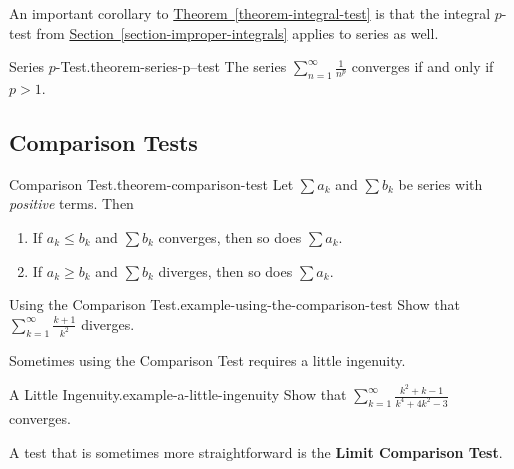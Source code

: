 \documentclass[10pt,]{book}
\newcommand{\terminology}[1]{\textbf{#1}}
\numberwithin{equation}{section}
\newcommand{\gt}{>}
\begin{document}
\hypertarget{p-879}{}%
An important corollary to \hyperref[theorem-integral-test]{Theorem~\ref{theorem-integral-test}} is that the integral \(p\)-test from \hyperref[section-improper-integrals]{Section~\ref{section-improper-integrals}} applies to series as well.%
\begin{theorem}{Series \(p\)-Test.}{}{theorem-series-p--test}%
\hypertarget{p-880}{}%
The series \(\sum_{n=1}^{\infty}\frac{1}{n^{p}}\) converges if and only if \(p \gt 1\).%
\end{theorem}
%
%
\typeout{************************************************}
\typeout{************************************************}
%
\subsection[{Comparison Tests}]{Comparison Tests}\label{subsection-comparison-tests}
\begin{theorem}{Comparison Test.}{}{theorem-comparison-test}%
\hypertarget{p-881}{}%
Let \(\sum a_{k}\) and \(\sum b_{k}\) be series with \emph{positive} terms. Then \leavevmode%
\begin{enumerate}
\item\hypertarget{li-94}{}\hypertarget{p-882}{}%
If \(a_{k}\leq b_{k}\) and \(\sum b_{k}\) converges, then so does \(\sum a_{k}\).%
\item\hypertarget{li-95}{}\hypertarget{p-883}{}%
If \(a_{k} \geq b_{k}\) and \(\sum b_{k}\) diverges, then so does \(\sum a_{k}\).%
\end{enumerate}
%
\end{theorem}
\begin{example}{Using the Comparison Test.}{example-using-the-comparison-test}%
\hypertarget{p-884}{}%
Show that \(\sum_{k=1}^{\infty}\frac{k + 1}{k^{2}}\) diverges.%
\end{example}
\hypertarget{p-885}{}%
Sometimes using the Comparison Test requires a little ingenuity.%
\begin{example}{A Little Ingenuity.}{example-a-little-ingenuity}%
\hypertarget{p-886}{}%
Show that \(\sum_{k=1}^{\infty}\frac{k^{2} + k - 1}{k^{4} + 4k^{2} - 3}\) converges.%
\end{example}
\hypertarget{p-887}{}%
A test that is sometimes more straightforward is the \terminology{Limit Comparison Test}.%
\end{document}
